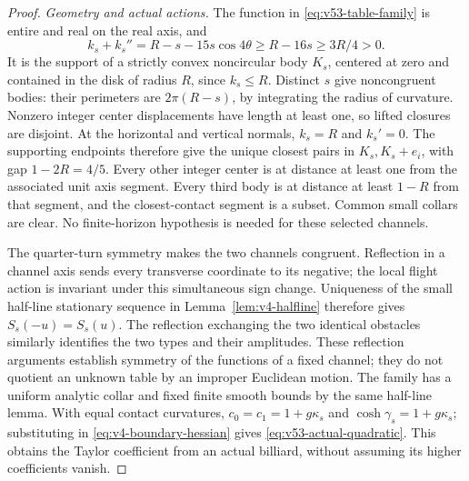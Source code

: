 \begin{proof}
\emph{Geometry and actual actions.}
The function in \eqref{eq:v53-table-family} is entire and real on the
real axis, and
\[
 k_s+k_s''=R-s-15s\cos4\theta\ge R-16s\ge3R/4>0.
\]
It is the support of a strictly convex noncircular body $K_s$, centered
at zero and contained in the disk of radius $R$, since $k_s\le R$.
Distinct $s$ give noncongruent bodies: their perimeters are $2\pi(R-s)$,
by integrating the radius of curvature.  Nonzero integer center
displacements have length at least one, so lifted closures are disjoint.
At the horizontal and vertical normals, $k_s=R$ and $k_s'=0$.
The supporting endpoints therefore give the unique closest pairs in
$K_s,K_s+e_i$, with gap $1-2R=4/5$.  Every other integer center is at
distance at least one from the associated unit axis segment.  Every
third body is at distance at least $1-R$ from that segment, and the
closest-contact segment is a subset.  Common small collars are clear.
No finite-horizon hypothesis is needed for these selected channels.

The quarter-turn symmetry makes the two channels congruent.  Reflection
in a channel axis sends every transverse coordinate to its negative;
the local flight action is invariant under this simultaneous sign change.
Uniqueness of the small half-line stationary sequence in
Lemma~\ref{lem:v4-halfline} therefore gives $S_s(-u)=S_s(u)$.
The reflection exchanging the two identical obstacles similarly identifies
the two types and their amplitudes.  These reflection arguments establish
symmetry of the functions of a fixed channel; they do not quotient an
unknown table by an improper Euclidean motion.  The family has a uniform
analytic collar and fixed finite smooth bounds by the same half-line
lemma.  With equal contact curvatures, $c_0=c_1=1+g\kappa_s$ and
$\cosh\gamma_s=1+g\kappa_s$; substituting in
\eqref{eq:v4-boundary-hessian} gives \eqref{eq:v53-actual-quadratic}.
This obtains the Taylor coefficient from an actual billiard, without
assuming its higher coefficients vanish.


\end{proof}
